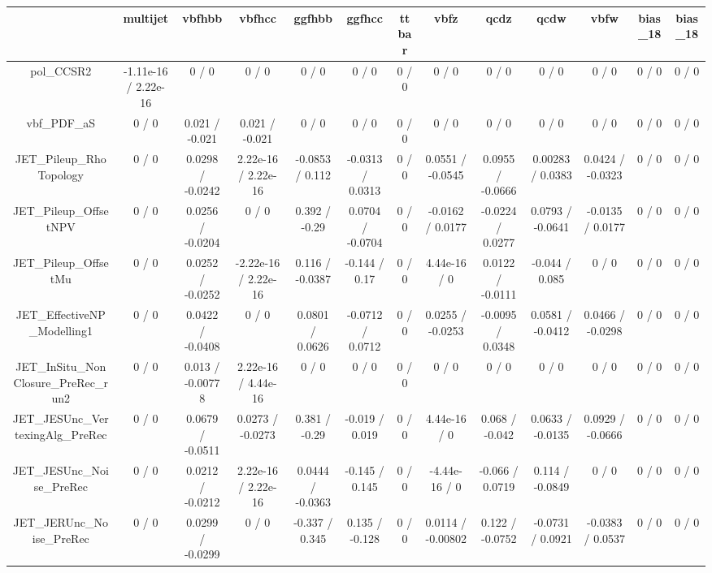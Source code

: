 \documentclass[10pt]{article}
\begin{document}
\begin{table}[htbp]
\begin{center}
\begin{tabular}{|c|c|c|c|c|c|c|c|c|c|c|c|c|}
\hline 
      & multijet      & vbfhbb      & vbfhcc      & ggfhbb      & ggfhcc      & ttbar      & vbfz      & qcdz      & qcdw      & vbfw      & bias_18      & bias_18 \\ 
\hline 
  pol_CCSR2 & -1.11e-16 / 2.22e-16 & 0 / 0 & 0 / 0 & 0 / 0 & 0 / 0 & 0 / 0 & 0 / 0 & 0 / 0 & 0 / 0 & 0 / 0 & 0 / 0 & 0 / 0 \\ 
  vbf_PDF_aS & 0 / 0 & 0.021 / -0.021 & 0.021 / -0.021 & 0 / 0 & 0 / 0 & 0 / 0 & 0 / 0 & 0 / 0 & 0 / 0 & 0 / 0 & 0 / 0 & 0 / 0 \\ 
  JET_Pileup_RhoTopology & 0 / 0 & 0.0298 / -0.0242 & 2.22e-16 / 2.22e-16 & -0.0853 / 0.112 & -0.0313 / 0.0313 & 0 / 0 & 0.0551 / -0.0545 & 0.0955 / -0.0666 & 0.00283 / 0.0383 & 0.0424 / -0.0323 & 0 / 0 & 0 / 0 \\ 
  JET_Pileup_OffsetNPV & 0 / 0 & 0.0256 / -0.0204 & 0 / 0 & 0.392 / -0.29 & 0.0704 / -0.0704 & 0 / 0 & -0.0162 / 0.0177 & -0.0224 / 0.0277 & 0.0793 / -0.0641 & -0.0135 / 0.0177 & 0 / 0 & 0 / 0 \\ 
  JET_Pileup_OffsetMu & 0 / 0 & 0.0252 / -0.0252 & -2.22e-16 / 2.22e-16 & 0.116 / -0.0387 & -0.144 / 0.17 & 0 / 0 & 4.44e-16 / 0 & 0.0122 / -0.0111 & -0.044 / 0.085 & 0 / 0 & 0 / 0 & 0 / 0 \\ 
  JET_EffectiveNP_Modelling1 & 0 / 0 & 0.0422 / -0.0408 & 0 / 0 & 0.0801 / 0.0626 & -0.0712 / 0.0712 & 0 / 0 & 0.0255 / -0.0253 & -0.0095 / 0.0348 & 0.0581 / -0.0412 & 0.0466 / -0.0298 & 0 / 0 & 0 / 0 \\ 
  JET_InSitu_NonClosure_PreRec_run2 & 0 / 0 & 0.013 / -0.00778 & 2.22e-16 / 4.44e-16 & 0 / 0 & 0 / 0 & 0 / 0 & 0 / 0 & 0 / 0 & 0 / 0 & 0 / 0 & 0 / 0 & 0 / 0 \\ 
  JET_JESUnc_VertexingAlg_PreRec & 0 / 0 & 0.0679 / -0.0511 & 0.0273 / -0.0273 & 0.381 / -0.29 & -0.019 / 0.019 & 0 / 0 & 4.44e-16 / 0 & 0.068 / -0.042 & 0.0633 / -0.0135 & 0.0929 / -0.0666 & 0 / 0 & 0 / 0 \\ 
  JET_JESUnc_Noise_PreRec & 0 / 0 & 0.0212 / -0.0212 & 2.22e-16 / 2.22e-16 & 0.0444 / -0.0363 & -0.145 / 0.145 & 0 / 0 & -4.44e-16 / 0 & -0.066 / 0.0719 & 0.114 / -0.0849 & 0 / 0 & 0 / 0 & 0 / 0 \\ 
  JET_JERUnc_Noise_PreRec & 0 / 0 & 0.0299 / -0.0299 & 0 / 0 & -0.337 / 0.345 & 0.135 / -0.128 & 0 / 0 & 0.0114 / -0.00802 & 0.122 / -0.0752 & -0.0731 / 0.0921 & -0.0383 / 0.0537 & 0 / 0 & 0 / 0 \\ 

\end{tabular}
\end{center}
\end{table}
\end{document}
